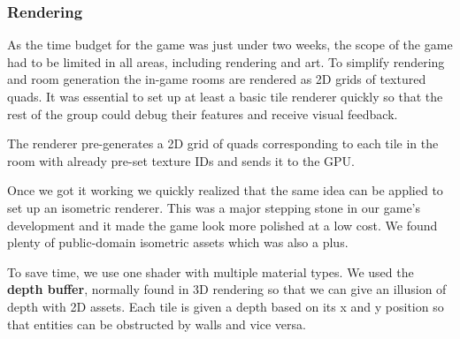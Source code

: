 \documentclass{article}
\begin{document}
\subsubsection{Rendering}
As the time budget for the game was just under two weeks, the scope of the game had to be limited in all areas, including rendering and art. To simplify rendering and room generation the in-game rooms are rendered as 2D grids of textured quads. It was essential to set up at least a basic tile renderer quickly so that the rest of the group could debug their features and receive visual feedback. \par
The renderer pre-generates a 2D grid of quads corresponding to each tile in the room with already pre-set texture IDs and sends it to the GPU. \par
Once we got it working we quickly realized that the same idea can be applied to set up an isometric renderer. This was a major stepping stone in our game's development and it made the game look more polished at a low cost. We found plenty of public-domain isometric assets which was also a plus. \par
To save time, we use one shader with multiple material types. We used the \textbf{depth buffer}, normally found in 3D rendering so that we can give an illusion of depth with 2D assets. Each tile is given a depth based on its x and y position so that entities can be obstructed by walls and vice versa.
\end{document}
